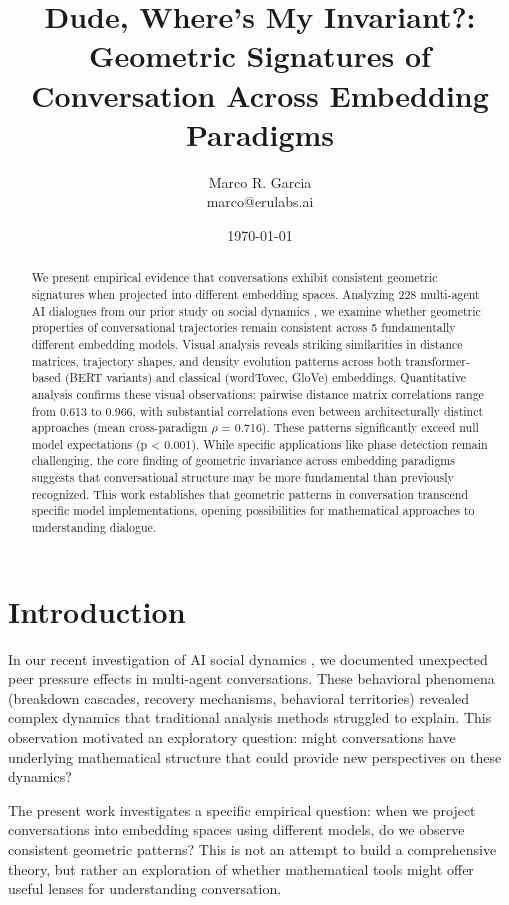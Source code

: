 \documentclass[11pt,letterpaper]{article}
\title{Dude, Where's My Invariant?: Geometric Signatures of Conversation Across Embedding Paradigms}
\author{
Marco R. Garcia \\
marco@erulabs.ai
}
\date{\today}
\newcommand{\totalConversations}{228}
\newcommand{\numEmbeddingModels}{5}
\newcommand{\minPairwiseCorr}{0.613}
\newcommand{\maxPairwiseCorr}{0.966}
\newcommand{\crossParadigmCorr}{0.716}
\newcommand{\nullModelPValue}{0.001}
\begin{document}
\maketitle

\begin{abstract}
We present empirical evidence that conversations exhibit consistent geometric signatures when projected into different embedding spaces. Analyzing \totalConversations{} multi-agent AI dialogues from our prior study on social dynamics \citep{garcia2025peer}, we examine whether geometric properties of conversational trajectories remain consistent across \numEmbeddingModels{} fundamentally different embedding models. Visual analysis reveals striking similarities in distance matrices, trajectory shapes, and density evolution patterns across both transformer-based (BERT variants) and classical (wordTovec, GloVe) embeddings. Quantitative analysis confirms these visual observations: pairwise distance matrix correlations range from \minPairwiseCorr{} to \maxPairwiseCorr{}, with substantial correlations even between architecturally distinct approaches (mean cross-paradigm $\rho$ = \crossParadigmCorr{}). These patterns significantly exceed null model expectations (p < \nullModelPValue{}). While specific applications like phase detection remain challenging, the core finding of geometric invariance across embedding paradigms suggests that conversational structure may be more fundamental than previously recognized. This work establishes that geometric patterns in conversation transcend specific model implementations, opening possibilities for mathematical approaches to understanding dialogue.
\end{abstract}

\section{Introduction}

In our recent investigation of AI social dynamics \citep{garcia2025peer}, we documented unexpected peer pressure effects in multi-agent conversations. These behavioral phenomena (breakdown cascades, recovery mechanisms, behavioral territories) revealed complex dynamics that traditional analysis methods struggled to explain. This observation motivated an exploratory question: might conversations have underlying mathematical structure that could provide new perspectives on these dynamics?

The present work investigates a specific empirical question: when we project conversations into embedding spaces using different models, do we observe consistent geometric patterns? This is not an attempt to build a comprehensive theory, but rather an exploration of whether mathematical tools might offer useful lenses for understanding conversation.
\end{document}
